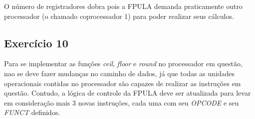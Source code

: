 \documentclass[12pt, a4paper, twoside]{article}
\begin{document}
O número de registradores dobra pois a FPULA demanda praticamente outro processador (o chamado coprocessador 1) para poder realizar seus cálculos.

\subsection{Exercício 10}

Para se implementar as funções \textit{ceil}, \textit{floor} e \textit{round} no processador em questão, nao se deve fazer mudanças no caminho de dados, já que todas as unidades operacionais contidas no processador são capazes de realizar as instruções em questão. Contudo, a lógica de controle da FPULA deve ser atualizada para levar em consideração mais 3 novas instruções, cada uma com seu \textit{OPCODE} e seu \textit{FUNCT} definidos.
\end{document}

